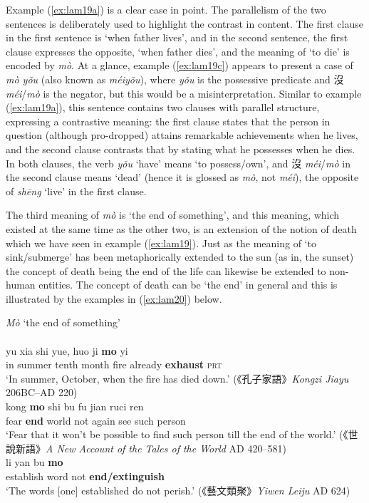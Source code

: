 \documentclass[output=paper,colorlinks,citecolor=brown,chinesefont]{langscibook}
\begin{document}
Example (\ref{ex:lam19a}) is a clear case in point. The parallelism of the two sentences is deliberately used to highlight the contrast in content. The first clause in the first sentence is `when father lives', and in the second sentence, the first clause expresses the opposite, `when father dies', and the meaning of `to die' is encoded by \textit{mò}. At a glance, example (\ref{ex:lam19c}) appears to present a case of \textit{mò yǒu} (also known as \textit{méiyǒu}), where \textit{yǒu} is the possessive predicate and {\cn 沒} \textit{méi}/\textit{mò} is the negator, but this would be a misinterpretation. Similar to example (\ref{ex:lam19a}), this sentence contains two clauses with parallel structure, expressing a contrastive meaning: the first clause states that the person in question (although pro-dropped) attains remarkable achievements when he lives, and the second clause contrasts that by stating what he possesses when he dies. In both clauses, the verb \textit{yǒu} `have' means `to possess/own', and {\cn 沒} \textit{méi}/\textit{mò} in the second clause means `dead' (hence it is glossed as \textit{mò}, not \textit{méi}), the opposite of \textit{shēng} `live' in the first clause.

The third meaning of \textit{mò} is `the end of something', and this meaning, which existed at the same time as the other two, is an extension of the notion of death which we have seen in example (\ref{ex:lam19}). Just as the meaning of `to sink/submerge' has been metaphorically extended to the sun (as in, the sunset) the concept of death being the end of the life can likewise be extended to non-human entities. The concept of death can be `the end' in general and this is illustrated by the examples in (\ref{ex:lam20}) below. 

\ea \textit{Mò} `the end of something'  \label{ex:lam20}\\
   \label{ex:lam20a}\\
  	\gll yu xia shi yue, huo ji	\textbf{mo} yi\\
  	in	summer	tenth	month fire already \textbf{exhaust} \textsc{prt}\\
  	\glt `In summer, October, when the fire has died down.' ({\cn 《孔子家語》}\emph{Kongzi Jiayu} 206BC–AD 220)
   \label{ex:lam20b}\\
  	\gll kong \textbf{mo} shi bu fu jian ruci ren\\
  	fear \textbf{end} world not again	see	such person\\
  	\glt `Fear that it won't be possible to find such person till the end of the world.' ({\cn 《世說新語》}\tablevspace\emph{A New Account of the Tales of the World} AD 420–581)
   \label{ex:lam20c}\\
	\gll li yan bu \textbf{mo}\\
	establish word not \textbf{end/extinguish}\\
	\glt `The words [one] established do not perish.' ({\cn 《藝文類聚》}\emph{Yiwen Leiju} AD 624)
\z \z
\end{document}
